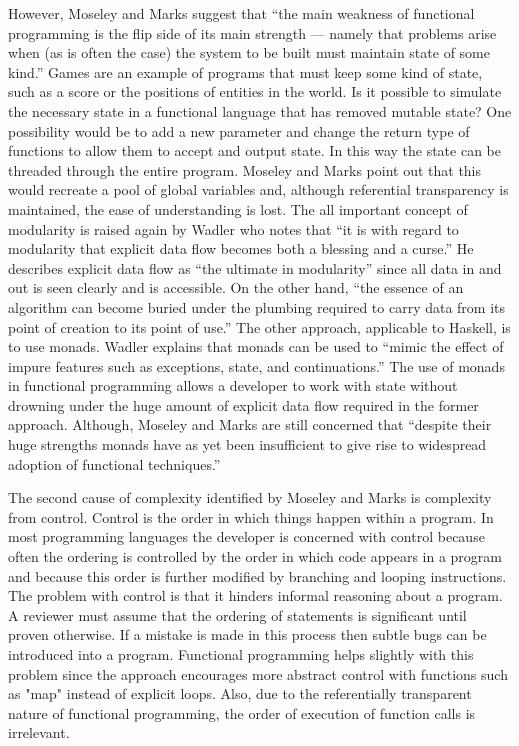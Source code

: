 However, Moseley and Marks suggest that ``the main weakness of functional programming
is the flip side of its main strength --- namely that problems arise when (as is often the
case) the system to be built must maintain state of some kind.'' Games are an
example of programs that must keep some kind of state, such as a score or the
positions of entities in the world. Is it possible to simulate the necessary state
in a functional language that has removed mutable state? One possibility would be
to add a new parameter and change the return type of functions to allow them to
accept and output state. In this way the state can be threaded through the entire
program. Moseley and Marks point out that this would recreate a pool of global
variables and, although referential transparency is maintained, the ease of understanding
is lost. The all important concept of modularity is raised again by Wadler who
notes that ``it is with regard to modularity that explicit data flow becomes both
a blessing and a curse.''\cite{wadler1995monads} He describes explicit data flow
as ``the ultimate in modularity'' since all data in and out is seen clearly and is
accessible. On the other hand, ``the essence of an algorithm can become buried under
the plumbing required to carry data from its point of creation to its point of use.''
The other approach, applicable to Haskell, is to use monads. Wadler explains that
monads can be used to ``mimic the effect of impure features such as exceptions,
state, and continuations.''\cite{wadler1992essence} The use of monads in functional
programming allows a developer to work with state without drowning under the huge
amount of explicit data flow required in the former approach. Although, Moseley and Marks
are still concerned that ``despite their huge strengths monads have as yet been
insufficient to give rise to widespread adoption of functional techniques.''

The second cause of complexity identified by Moseley and Marks is complexity
from control. Control is the order in which things happen within a program.
In most programming languages the developer is concerned with control because
often the ordering is controlled by the order in which code appears in a program
and because this order is further modified by branching and looping instructions.
The problem with control is that it hinders informal reasoning about a program.
A reviewer must assume that the ordering of statements is significant until
proven otherwise. If a mistake is made in this process then subtle bugs can
be introduced into a program. Functional programming helps slightly with this
problem since the approach encourages more abstract control with functions
such as "map" instead of explicit loops. Also, due to the referentially transparent
nature of functional programming, the order of execution of function calls
is irrelevant.\cite{hughes1989whyfp}\cite{wadler1995monads}

